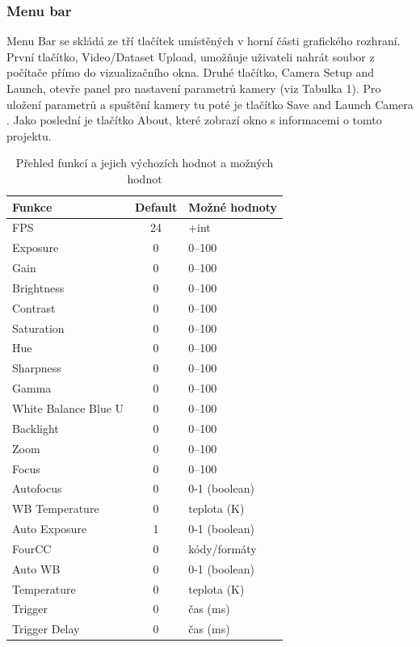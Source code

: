 \documentclass[a4paper,11pt]{article}
\begin{document}
\newpage

\subsubsection{Menu bar}
Menu Bar se skládá ze tří tlačítek umístěných v horní části grafického rozhraní. První tlačítko, Video/Dataset Upload, umožňuje uživateli nahrát soubor z počítače přímo do vizualizačního okna. Druhé tlačítko, Camera Setup and Launch, otevře panel pro nastavení parametrů kamery (viz Tabulka 1). Pro uložení parametrů a spuštění kamery tu poté je tlačítko Save and Launch Camera . Jako poslední je tlačítko About, které zobrazí okno s informacemi o tomto projektu.

\begin{table}[h!]
\centering
\begin{tabular}{|l|c|l|}
\hline
\textbf{Funkce} & \textbf{Default} & \textbf{Možné hodnoty} \\
\hline
FPS & 24 & +int\\
Exposure & 0 & 0--100\\
Gain & 0 & 0--100\\
Brightness & 0 & 0--100\\
Contrast & 0 & 0--100\\
Saturation & 0 & 0--100\\
Hue & 0 & 0--100\\
Sharpness & 0 & 0--100\\
Gamma & 0 & 0--100\\
White Balance Blue U & 0 & 0--100\\
Backlight & 0 & 0--100\\
Zoom & 0 & 0--100\\
Focus & 0 & 0--100\\
Autofocus & 0 & 0-1 (boolean)\\
WB Temperature & 0 & teplota (K)\\
Auto Exposure & 1 & 0-1 (boolean)\\
FourCC & 0 & kódy/formáty\\
Auto WB & 0 & 0-1 (boolean)\\
Temperature & 0 & teplota (K)\\
Trigger & 0 & čas (ms)\\
Trigger Delay & 0 & čas (ms)\\

\hline
\end{tabular}
\caption{Přehled funkcí a jejich výchozích hodnot a možných hodnot}
\end{table}
\end{document}
